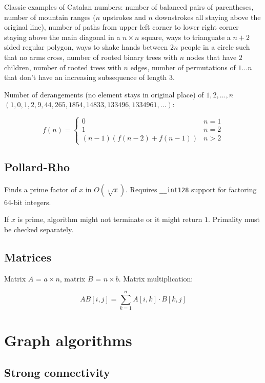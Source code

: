 \documentclass{article}
\begin{document}
Classic examples of Catalan numbers: number of balanced pairs of parentheses,  number of mountain ranges ($n$ upstrokes and $n$ downstrokes all staying above the original line), number of paths from upper left corner to lower right corner staying above the main diagonal in a $n \times n$ square, ways to trianguate a $n+2$ sided regular polygon, ways to shake hands between $2n$ people in a circle such that no arms cross, number of rooted binary trees with $n$ nodes that have $2$ children, number of rooted trees with $n$ edges, number of permutations of $1 \dots n$ that don't have an increasing subsequence of length $3$.

Number of derangements (no element stays in original place) of $1, 2, \dots, n$ $(1, 0, 1, 2, 9, 44, 265, 1854, 14833, 133496, 1334961, \dots)$:

\[
	f(n) =
	\begin{cases}
		0 &n = 1 \\
		1 &n = 2 \\
		(n-1)(f(n-2)+f(n-1)) &n > 2
	\end{cases}
\]

\subsection{Pollard-Rho}

Finds a prime factor of $x$ in $O(\sqrt[4]{x})$. Requires \verb|__int128| support for factoring 64-bit integers.

If $x$ is prime, algorithm might not terminate or it might return $1$. Primality must be checked separately.



\subsection {Matrices}

Matrix $A$ = $a \times n$, matrix $B$ = $n \times b$. Matrix multiplication:

\[ AB[i,j] = \sum_{k=1}^{n} A[i,k] \cdot B[k,j] \]



\section {Graph algorithms}

\subsection {Strong connectivity}
\end{document}
